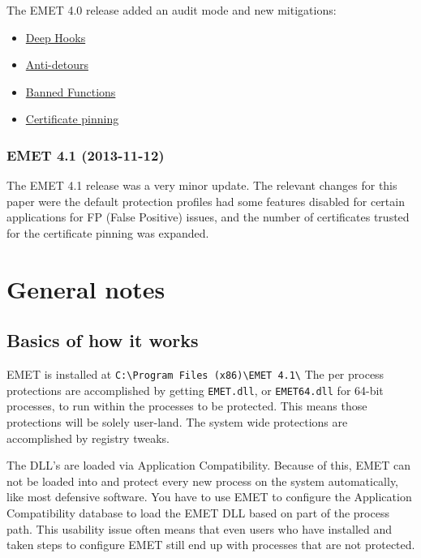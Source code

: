 \documentclass[]{article}
\begin{document}
The EMET 4.0 release\cite{emet4_0} added an audit mode and new mitigations:

\begin{itemize}
\item
  \hyperref[deep-hooks]{Deep Hooks}
\item
  \hyperref[anti-detours]{Anti-detours}
\item
  \hyperref[banned-functions]{Banned Functions} 
\item
  \hyperref[pinning]{Certificate pinning}
\end{itemize}

\subsubsection{EMET 4.1 (2013-11-12)}\label{emet-4.1}

The EMET 4.1 release\cite{emet4_1} was a very minor update.  The relevant changes for this paper were the default protection profiles had some features disabled for certain applications for FP (False Positive) issues, and the number of certificates trusted for the certificate pinning was expanded.








\section{General notes}\label{general-notes}

\subsection{Basics of how it works}\label{basics-of-how-it-works}

EMET is installed at
\texttt{C:\textbackslash{}Program Files (x86)\textbackslash{}EMET 4.1\textbackslash{}}
The per process protections are accomplished by getting \texttt{EMET.dll}, or \texttt{EMET64.dll} for 64-bit processes, to run
within the processes to be protected.
This means those protections will be solely user-land.
The system wide protections are accomplished by registry tweaks.



The DLL's are loaded via Application Compatibility\cite{app_compat, app_compat_ms}.
Because of this, EMET can not be loaded into and protect every new process
on the system automatically, like most defensive software. 
You have to use EMET to configure the Application Compatibility database to load the
EMET DLL based on part of the process path. 
This usability issue often means that even users who have installed and taken steps to configure EMET still end up with processes that are not protected.
\end{document}
